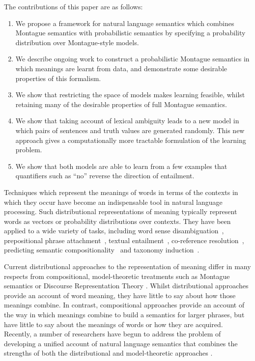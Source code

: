 \documentclass[11pt]{article}
\theoremstyle{definition}
\begin{document}
The contributions of this paper are as follows:
\begin{enumerate}
\item We propose a framework for natural language semantics which
  combines Montague semantics with probabilistic semantics by
  specifying a probability distribution over Montague-style models.
\item We describe ongoing work to construct a probabilistic Montague
  semantics in which meanings are learnt from data, and demonstrate
  some desirable properties of this formalism. 
\item We show that restricting the space of models makes learning
  feasible, whilst retaining many of the desirable properties of full
  Montague semantics.
\item We show that taking account of lexical ambiguity leads to a new
  model in which pairs of sentences and truth values are generated
  randomly. This new approach gives a computationally more tractable
  formulation of the learning problem.
\item We show that both models are able to learn from a few examples
  that quantifiers such as ``no'' reverse the direction of entailment.
\end{enumerate}

Techniques which represent the meanings of words in terms of the contexts in
which they occur have become an indispensable tool in natural language
processing. Such distributional representations of meaning typically
represent words as vectors or probability distributions over
contexts. They have been applied to a wide variety of tasks, including word sense disambiguation~\cite{miller-EtAl:2012:PAPERS,khapra-EtAl:2010:ACL}, prepositional phrase attachment~\cite{Calvo05distributionalthesaurus}, textual entailment~\cite{berant-dagan-goldberger:2010:ACL}, co-reference resolution~\cite{lee-EtAl:2012:EMNLP-CoNLL}, predicting semantic compositionality~\cite{bergsma-EtAl:2010:EMNLP} and taxonomy induction~\cite{fountain-lapata:2012:NAACL-HLT}.

Current distributional approaches to the representation of meaning
differ in many respects from compositional, model-theoretic treatments
such as Montague semantics or Discourse Representation Theory
\cite{Blackburn:05}. Whilst distributional approaches provide an
account of word meaning, they have little to say about how those meanings
combine. In contrast, compositional approaches provide an account of the way in
which meanings combine to build a semantics for larger phrases, but
have little to say about the meanings of words or how they are
acquired. Recently, a number of researchers have begun to address the
problem of developing a unified account of natural language semantics
that combines the strengths of both the distributional and
model-theoretic approaches
\cite{Clarke:07,Coecke:10,Garrette:11,Lewis:13}. 
\end{document}
